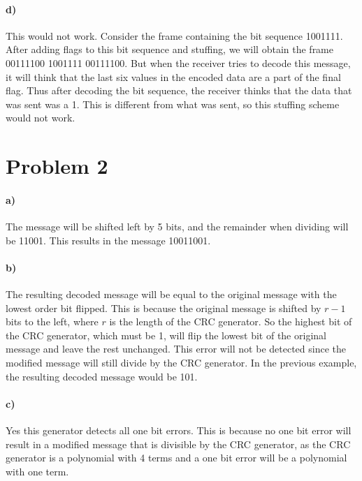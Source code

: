 \documentclass[12pt]{article}
\begin{document}
\paragraph{d)}

This would not work. Consider the frame containing the bit sequence 1001111. After adding flags to this bit sequence and stuffing, we will obtain the frame 00111100 1001111 00111100. But when the receiver
tries to decode this message, it will think that the last six values in the encoded data are a part of the final flag. Thus after decoding the bit sequence, the receiver thinks that the data that was sent was
a 1. This is different from what was sent, so this stuffing scheme would not work.

\section*{Problem 2}

\paragraph{a)}

The message will be shifted left by 5 bits, and the remainder when dividing will be 11001. This results in the message 10011001.

\paragraph{b)}

The resulting decoded message will be equal to the original message with the lowest order bit flipped. This is because the original message is shifted by \(r-1\) bits to the left, where \(r\) is the length of the
CRC generator. So the highest bit of the CRC generator, which must be 1, will flip the lowest bit of the original message and leave the rest unchanged. This error will not be detected since the modified message
will still divide by the CRC generator. In the previous example, the resulting decoded message would be 101.

\paragraph{c)}

Yes this generator detects all one bit errors. This is because no one bit error will result in a modified message that is divisible by the CRC generator, as the CRC generator is a polynomial with 4 terms and
a one bit error will be a polynomial with one term.
\end{document}
